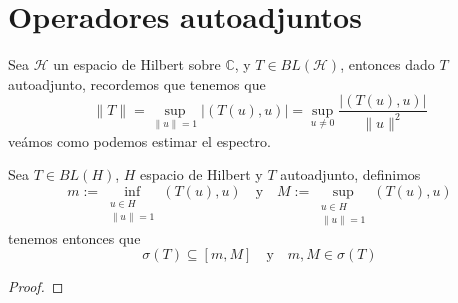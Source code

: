 \section{Operadores autoadjuntos}
\noindent
Sea $\mathcal{H}$ un espacio de Hilbert sobre $\mathbb{C}$, y $T \in BL(\mathcal{H})$, entonces dado $T$ autoadjunto, recordemos que tenemos que 
\begin{equation*}
    \|T\| = \sup_{\|u\|=1} |( T(u), u )| = \sup_{u \neq 0} \frac{|( T(u), u )|}{\|u\|^2}
\end{equation*}
veámos como podemos estimar el espectro.

\begin{teo}
    Sea $T \in BL(H)$, $H$ espacio de Hilbert  y $T$ autoadjunto, definimos
    \begin{equation*}
        m := \inf_{\substack{u \in H \\ \|u\|=1}} (T(u), u ) \quad \text{y} \quad M := \sup_{\substack{u \in H \\ \|u\|=1}} ( T(u), u )
    \end{equation*}
    tenemos entonces que 
    \begin{equation*}
        \sigma(T) \subseteq [m, M] \quad \text{y} \quad m, M \in \sigma(T)
    \end{equation*}
\begin{proof} %










\end{proof}
\end{teo}

